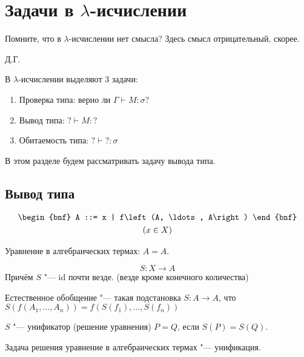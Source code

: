 \section{\texorpdfstring{Задачи в $\lambda$-исчислении}{Link to programming}}
\epigraph{Помните, что в $\lambda$-исчислении нет смысла? Здесь смысл отрицательный, скорее.}{Д.Г.}

В $\lambda$-исчислении выделяют 3 задачи:
\begin{enumerate}[label=(\asbuk*)]
    \item Проверка типа: верно ли $\Gamma \vdash M : \sigma$?
    \item Вывод типа: $? \vdash M : ?$
    \item Обитаемость типа: $? \vdash ? : \sigma$
\end{enumerate}

В этом разделе будем рассматривать задачу вывода типа.

\subsection{\texorpdfstring{Вывод типа}{Type deduction}}

\begin{definition}
    \begin{gather*}
        \begin{bnf}
            A ::= x | f\left(A, \ldots, A\right)
        \end{bnf} \\
        (x \in X)
    \end{gather*}
\end{definition}

Уравнение в алгебраических термах: $A = A$.

\begin{definition}[$S$-подстановка]
    \[
        S : X \rightarrow A
    \]
    Причём $S$ "--- id почти везде. (везде кроме конечного количества)
\end{definition}

\begin{definition}
    Естественное обобщение "--- такая подстановка $S : A \rightarrow A$, что
    $S\left(f\left(A_1, \dots, A_n\right)\right) = f\left(S(f_1), \ldots, S(f_n)\right)$
\end{definition}

\begin{definition}[Унификатор]
    $S$ "--- унификатор (решение уравнения) $P=Q$, если $S(P)=S(Q)$.
\end{definition}
Задача решения уравнение в алгебраических термах "--- унификация.

